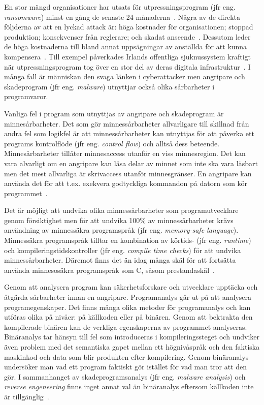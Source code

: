 En stor mängd organisationer har utsats för utpressningsprogram (jfr eng.
\emph{ransomware}) minst en gång de senaste 24 månaderna~\cite{cyberreason2021,
cyberreason2022}. Några av de direkta följderna av att en lyckad attack är: höga
kostnader för organisationen; stoppad produktion; konsekvenser från reglerare;
och skadat anseende~\cite{cyberreason2021, cyberreason2022}. Dessutom leder
de höga kostnaderna till bland annat uppsägningar av anställda för att kunna
kompensera~\cite{cyberreason2021, cyberreason2022}. Till exempel påverkades
Irlands offentliga sjuknussystem kraftigt när utpressningsprogram tog över en
stor del av deras digitala infrastruktur~\cite{hse_report, gallagher2023}. I
många fall är människan den svaga länken i cyberattacker men angripare och
skadeprogram (jfr eng. \emph{malware}) utnyttjar också olika sårbarheter i
programvaror.

Vanliga fel i program som utnyttjas av angripare och skadeprogram är
minnesårbarheter. Det som gör minnessårbarheter allvarligare till skillnad från
andra fel som logikfel är att minnessårbarheter kan utnyttjas för att påverka
ett programs kontrolflöde (jfr eng. \emph{control flow}) och alltså dess
beteende. Minnesårbarheter tillåter minnesaccess utanför en viss minnesregion.
Det kan vara alvarligt om en angripare kan läsa delar av minnet som inte ska
vara läsbart men det mest allvarliga är skrivaccess utanför minnesgränser. En
angripare kan använda det för att t.ex. exekvera godtyckliga kommandon på
datorn som kör programmet~\cite{computer_security_cs161}.

Det är möjligt att undvika olika minnessårbarheter som
programutvecklare genom försiktighet men för att undvika 100\% av
minnessårbarheter krävs användning av minnessäkra programspråk (jfr eng.
\emph{memory-safe language}).
Minnessäkra programspråk tilltar en kombination av körtids- (jfr eng.
\emph{runtime}) och kompileringstidskontroller (jfr eng. \emph{compile time
checks}) för att undvika minnessårbarheter. Däremot finns det än idag många
skäl för att fortsätta använda minnesosäkra programspråk som
C, såsom prestandaskäl~\cite{computer_security_cs161}.

Genom att analysera program kan säkerhetsforskare och utvecklare upptäcka
och åtgärda sårbarheter innan en angripare. Programanalys går ut på att
analysera programegenskaper. Det finns många olika metoder för programanalys
och kan utföras olika på nivåer: på källkoden eller på binären. Genom att
bektrakta den kompilerade binären kan de verkliga egenskaperna av programmet
analyseras. Binäranalys tar hänsyn till fel som introduceras i
kompileringssteget och undviker även problem med det semantiska gapet mellan
ett högnivåspråk och den faktiska maskinkod och data som blir produkten efter
kompilering. Genom binäranalys undersöker man vad ett program faktiskt gör
istället för vad man tror att den gör. I sammanhanget av skadeprogramsanalys
(jfr eng. \emph{malware analysis}) och \emph{reverse engeneering} finns inget
annat val än binäranalys eftersom källkoden inte är
tillgänglig~\cite{andriesse2018}.

